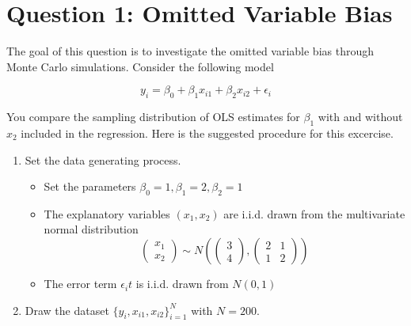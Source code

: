 \documentclass[]{book}
\providecommand{\tightlist}{%
  \setlength{\itemsep}{0pt}\setlength{\parskip}{0pt}}
\begin{document}
\section{Question 1: Omitted Variable
Bias}\label{question-1-omitted-variable-bias}

The goal of this question is to investigate the omitted variable bias
through Monte Carlo simulations. Consider the following model

\[
y_i = \beta_0 + \beta_1 x_{i1} + \beta_2 x_{i2} + \epsilon_i
\]

You compare the sampling distribution of OLS estimates for \(\beta_1\)
with and without \(x_2\) included in the regression. Here is the
suggested procedure for this excercise.

\begin{enumerate}
\def\labelenumi{\arabic{enumi}.}
\tightlist
\item
  Set the data generating process.

  \begin{itemize}
  \tightlist
  \item
    Set the parameters \(\beta_0 = 1, \beta_1 = 2, \beta_2 = 1\)
  \item
    The explanatory variables \((x_1, x_2)\) are i.i.d. drawn from the
    multivariate normal distribution \[
    \left(\begin{array}{c}
    x_{1}\\
    x_{2}
    \end{array}\right)\sim N\left(\left(\begin{array}{c}
    3\\
    4
    \end{array}\right),\left(\begin{array}{cc}
    2 & 1\\
    1 & 2
    \end{array}\right)\right)
    \]
  \item
    The error term \(\epsilon_it\) is i.i.d. drawn from \(N(0, 1)\)
  \end{itemize}
\item
  Draw the dataset \(\{y_i, x_{i1}, x_{i2} \}_{i=1}^N\) with
  \(N = 200\).


\end{enumerate}
\end{document}
